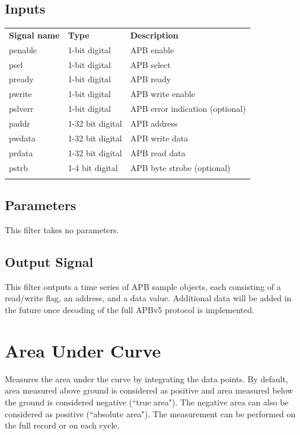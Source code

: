 \subsection{Inputs}

\begin{tabularx}{16cm}{llX}
\thickhline
\textbf{Signal name} & \textbf{Type} & \textbf{Description} \\
\thickhline
penable & 1-bit digital & APB enable \\
\thinhline
psel & 1-bit digital & APB select \\
\thinhline
pready & 1-bit digital & APB ready \\
\thinhline
pwrite & 1-bit digital & APB write enable \\
\thinhline
pslverr & 1-bit digital & APB error indication (optional)\\
\thinhline
paddr & 1-32 bit digital & APB address \\
\thinhline
pwdata & 1-32 bit digital & APB write data \\
\thinhline
prdata & 1-32 bit digital & APB read data \\
\thinhline
pstrb & 1-4 bit digital & APB byte strobe (optional)\\
\thickhline
\end{tabularx}

\subsection{Parameters}

This filter takes no parameters.

\subsection{Output Signal}

This filter outputs a time series of APB sample objects, each consisting of a read/write flag, an address, and a data
value. Additional data will be added in the future once decoding of the full APBv5 protocol is implemented.

\pagebreak
\section{Area Under Curve}
\label{filter:AreaUnderCurve}

Measures the area under the curve by integrating the data points. By default, area measured above ground is considered
as positive and area measured below the ground is considered negative (``true area"). The negative area can also be
considered as positive (``absolute area"). The measurement can be performed on the full record or on each
cycle.

